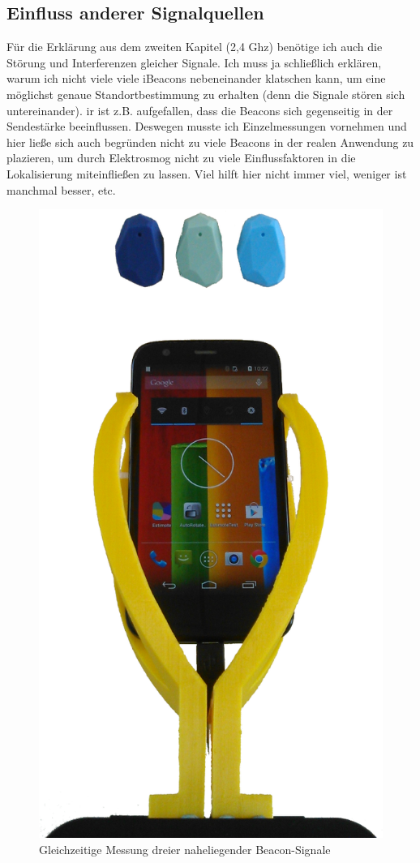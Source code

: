 \subsection{Einfluss anderer Signalquellen} 
Für die Erklärung aus dem zweiten Kapitel (2,4 Ghz) benötige ich auch die Störung und Interferenzen gleicher Signale. Ich muss ja schließlich erklären, warum ich nicht viele viele iBeacons nebeneinander klatschen kann, um eine möglichst genaue Standortbestimmung zu erhalten (denn die Signale stören sich untereinander). 
ir ist z.B. aufgefallen, dass die Beacons sich gegenseitig in der Sendestärke beeinflussen. Deswegen musste ich Einzelmessungen vornehmen und hier ließe sich auch begründen nicht zu viele Beacons in der realen Anwendung zu plazieren, um durch Elektrosmog nicht zu viele Einflussfaktoren in die Lokalisierung miteinfließen zu lassen. Viel hilft hier nicht immer viel, weniger ist manchmal besser, etc.
\begin{figure}[H] 
\centering
\includegraphics[scale=0.3]{Bilder/MessungBeacon3}
\caption{Gleichzeitige Messung dreier naheliegender Beacon-Signale}
\end{figure}

